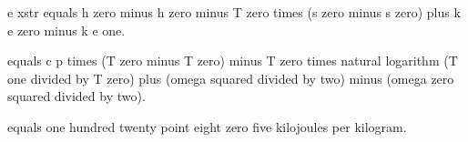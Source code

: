 e xstr equals h zero minus h zero minus T zero times (s zero minus s zero) plus k e zero minus k e one.

equals c p times (T zero minus T zero) minus T zero times natural logarithm (T one divided by T zero) plus (omega squared divided by two) minus (omega zero squared divided by two).

equals one hundred twenty point eight zero five kilojoules per kilogram.